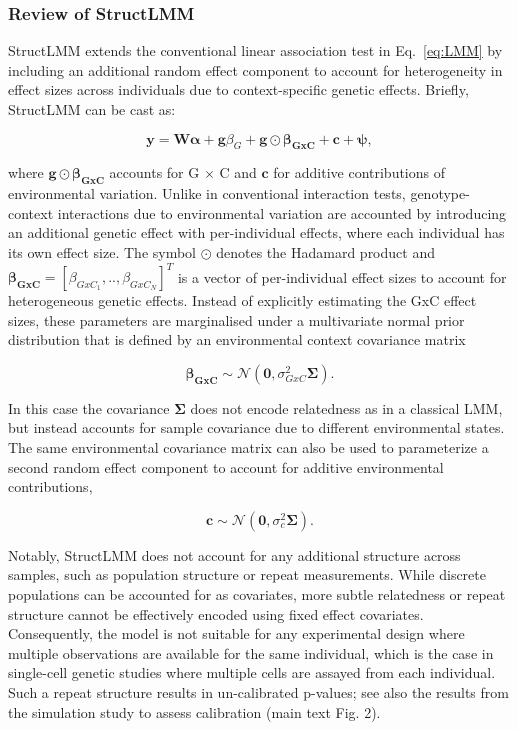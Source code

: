 \subsubsection*{Review of StructLMM}
StructLMM \cite{moore2019linear} extends the conventional linear association test in Eq.~\eqref{eq:LMM} by including an additional random effect component to account for heterogeneity in effect sizes across individuals due to context-specific genetic effects. 
Briefly, StructLMM can be cast as:

\begin{equation}\label{eq:StructLMM}
 \mathbf{y} =  \mathbf{W}\boldsymbol{\alpha} + \mathbf{g}\beta_G + \mathbf{g} \odot \boldsymbol{\beta_{GxC}} + \mathbf{c} +\boldsymbol{\psi}, 
\end{equation}

where $\mathbf{g} \odot \boldsymbol{\beta_{GxC}}$ accounts for G $\times$ C and $\mathbf{c}$ for additive contributions of environmental variation. 
Unlike in conventional interaction tests, genotype-context interactions due to environmental variation are accounted by introducing an additional genetic effect with per-individual effects, where each individual has its own effect size.
The symbol $\odot$ denotes the Hadamard product and $\boldsymbol{\beta_{GxC}}=[\beta_{GxC_1}, .. ,\beta_{GxC_N}]^T$ is a vector of per-individual effect sizes to account for heterogeneous genetic effects.
Instead of explicitly estimating the GxC effect sizes, these parameters are marginalised under a multivariate normal prior distribution that is defined by an environmental context covariance matrix

\begin{equation}\label{eq:beta_GxE}
    \boldsymbol{\beta_{GxC}} \sim \mathcal{N}(\mathbf{0},\sigma_{GxC}^2 \boldsymbol{\Sigma}).
\end{equation} 

In this case the covariance $\boldsymbol{\Sigma}$ does not encode relatedness as in a classical LMM, but instead accounts for sample covariance due to different environmental states.
The same environmental covariance matrix can also be used to parameterize a second random effect component to account for additive environmental contributions,

\begin{equation}
   \mathbf{c} \sim \mathcal{N}(\mathbf{0},\sigma_c^2 \boldsymbol{\Sigma}). 
\end{equation}

Notably, StructLMM does not account for any additional structure across samples, such as population structure or repeat measurements.
While discrete populations can be accounted for as covariates, more subtle relatedness or repeat structure cannot be effectively encoded using fixed effect covariates. 
Consequently, the model is not suitable for any experimental design where multiple observations are available for the same individual, which is the case in single-cell genetic studies where multiple cells are assayed from each individual. 
Such a repeat structure results in un-calibrated p-values; see also the results from the simulation study to assess calibration (main text Fig. 2). 


